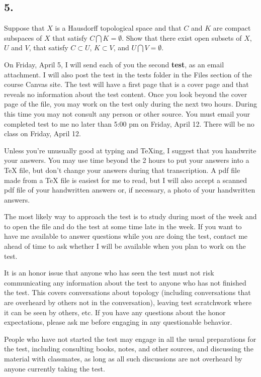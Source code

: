 \documentclass{amsart}
\theoremstyle{plain}
\theoremstyle{definition}
\theoremstyle{remark}
\begin{document}
\vspace{.15in}
\noindent
\subsection*{5.} Suppose that $X$ is a Hausdorff topological space and that $C$ and $K$ are compact subspaces of $X$ that satisfy $C\bigcap K = \emptyset$. Show that there exist open subsets of $X$, $U$ and $V$, that satisfy $C\subset U$, $K\subset V$, and $U\bigcap V = \emptyset$.

\vspace{.45in}
On Friday, April 5, I will send each of you the second {\bfseries test}, as an email attachment. I will also post the test in the tests folder in the Files section of the course Canvas site. The test will have a first page that is a cover page and that reveals no information about the test content.   Once you look beyond the cover page of the file, you may work on the test only during the next two hours.  During this time you may not consult any person or other source.  You must email your completed test to me 
no later than 5:00 pm on Friday, April 12.  There will be no class 
on Friday, April 12.  

Unless you're unusually good at typing and TeXing, I suggest that you handwrite your answers. You may use time beyond the 2 hours to put your answers into a TeX file, but don't change your answers during that transcription. A pdf file made from a TeX file is easiest for me to read, but I will also accept a scanned pdf file of your handwritten answers or, if necessary, a photo of your handwritten answers.

The most likely way to approach the test is to study during most of 
the week and to open the file and do the test at some time late in the week.  If you want to have me available to answer questions while you are doing the test, contact me ahead of time to ask whether I will be available when you plan to work on the test. 

It is an honor issue that anyone who has seen the test must not risk 
communicating any information about the test to anyone who has not 
finished the test.  This covers conversations about topology   
(including conversations that are overheard by others not in the 
conversation), leaving test scratchwork where it can be seen by others, etc.  If you have 
any questions about the honor expectations, please ask me before 
engaging in any questionable behavior.  

People who have not started the test may engage in all the usual 
preparations for the test, including consulting books, notes, and 
other sources, and discussing the material with classmates, as long as 
all such discussions are not overheard by anyone currently taking the 
test.
\end{document}
